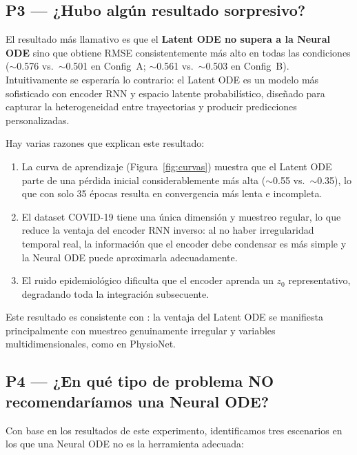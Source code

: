 \documentclass[12pt,a4paper]{article}
\begin{document}
\subsection{P3 — ¿Hubo algún resultado sorpresivo?}
\label{sec:p3}

El resultado más llamativo es que el \textbf{Latent ODE no supera a la Neural
ODE} sino que obtiene RMSE consistentemente más alto en todas las condiciones
($\sim$0.576 vs.\ $\sim$0.501 en Config~A; $\sim$0.561 vs.\ $\sim$0.503 en
Config~B).
Intuitivamente se esperaría lo contrario: el Latent ODE es un modelo más
sofisticado con encoder RNN y espacio latente probabilístico, diseñado para
capturar la heterogeneidad entre trayectorias y producir predicciones
personalizadas.

Hay varias razones que explican este resultado:
\begin{enumerate}
  \item La curva de aprendizaje (Figura~\ref{fig:curvas}) muestra que el Latent
    ODE parte de una pérdida inicial considerablemente más alta
    ($\sim$0.55 vs.\ $\sim$0.35), lo que con solo 35 épocas resulta en
    convergencia más lenta e incompleta.
  \item El dataset COVID-19 tiene una única dimensión y muestreo regular, lo
    que reduce la ventaja del encoder RNN inverso: al no haber irregularidad
    temporal real, la información que el encoder debe condensar es más simple
    y la Neural ODE puede aproximarla adecuadamente.
  \item El ruido epidemiológico dificulta que el encoder aprenda un $z_0$
    representativo, degradando toda la integración subsecuente.
\end{enumerate}

Este resultado es consistente con \citet{rubanova2019}: la ventaja del Latent
ODE se manifiesta principalmente con muestreo genuinamente irregular y variables
multidimensionales, como en PhysioNet.

\subsection{P4 — ¿En qué tipo de problema NO recomendaríamos una Neural ODE?}
\label{sec:p4}

Con base en los resultados de este experimento, identificamos tres escenarios en
los que una Neural ODE no es la herramienta adecuada:
\end{document}
